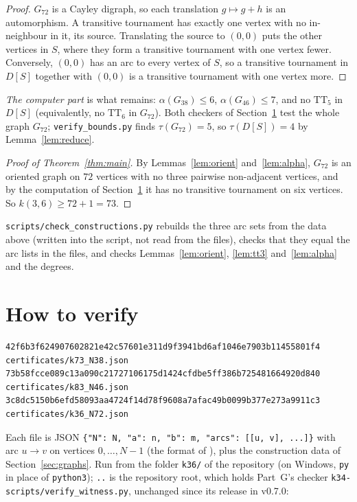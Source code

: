 \documentclass[11pt]{amsart}
\newcommand{\TT}[1]{\mathrm{TT}_{#1}}
\theoremstyle{plain}
\theoremstyle{definition}
\theoremstyle{remark}
\begin{document}
\begin{proof}
$G_{72}$ is a Cayley digraph, so each translation $g\mapsto g+h$ is an automorphism. A transitive
tournament has exactly one vertex with no in-neighbour in it, its source. Translating the source
to $(0,0)$ puts the other vertices in $S$, where they form a transitive tournament with one vertex
fewer. Conversely, $(0,0)$ has an arc to every vertex of $S$, so a transitive tournament in $D[S]$
together with $(0,0)$ is a transitive tournament with one vertex more.
\end{proof}

\noindent\emph{The computer part} is what remains: $\alpha(G_{38})\leq 6$, $\alpha(G_{46})\leq 7$,
and no $\TT{5}$ in $D[S]$ (equivalently, no $\TT{6}$ in $G_{72}$). Both checkers of
Section~\ref{sec:verify} test the whole graph $G_{72}$; \texttt{verify\_bounds.py} finds
$\tau(G_{72})=5$, so $\tau(D[S])=4$ by Lemma~\ref{lem:reduce}.

\begin{proof}[Proof of Theorem~\ref{thm:main}]
By Lemmas~\ref{lem:orient} and~\ref{lem:alpha}, $G_{72}$ is an oriented graph on $72$ vertices
with no three pairwise non-adjacent vertices, and by the computation of Section~\ref{sec:verify}
it has no transitive tournament on six vertices. So $k(3,6)\geq 72+1=73$.
\end{proof}

\noindent\texttt{scripts/check\_constructions.py} rebuilds the three arc sets from the data above
(written into the script, not read from the files), checks that they equal the arc lists in the
files, and checks Lemmas~\ref{lem:orient}, \ref{lem:tt3} and~\ref{lem:alpha} and the degrees.

\section{How to verify}\label{sec:verify}

{\footnotesize\begin{verbatim}
42f6b3f624907602821e42c57601e311d9f3941bd6af1046e7903b11455801f4  certificates/k73_N38.json
73b58fcce089c13a090c21727106175d1424cfdbe5ff386b725481664920d840  certificates/k83_N46.json
3c8dc5150b6efd58093aa4724f14d78f9608a7afac49b0099b377e273a9911c3  certificates/k36_N72.json
\end{verbatim}}

Each file is JSON \verb|{"N": N, "a": n, "b": m, "arcs": [[u, v], ...]}| with arc $u\to v$ on
vertices $0,\dots,N-1$ (the format of \cite{PartG}), plus the construction data of
Section~\ref{sec:graphs}. Run from the folder \texttt{k36/} of the repository (on Windows,
\texttt{py} in place of \texttt{python3}); \texttt{..} is the repository root, which holds Part~G's
checker \texttt{k34-scripts/verify\_witness.py}, unchanged since its release in v0.7.0:
\end{document}
